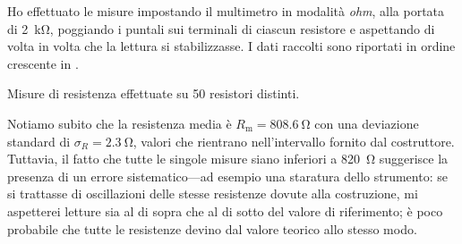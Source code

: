         Ho effettuato le misure impostando il multimetro in modalità \emph{ohm}, alla portata di \SI{2}{\kilo\ohm}, poggiando i puntali sui terminali di ciascun resistore e aspettando di volta in volta che la lettura si stabilizzasse. I dati raccolti sono riportati in ordine crescente in .
        \begin{table}
            \centering
            
            \caption{Misure di resistenza effettuate su \num{50} resistori distinti.}
            \label{tab:mul:resistori}
        \end{table}

        Notiamo subito che la resistenza media è $R_\text{m} = \SI{808.6}{\ohm}$ con una deviazione standard di $\sigma_R = \SI{2.3}{\ohm}$, valori che rientrano nell'intervallo fornito dal costruttore. Tuttavia, il fatto che tutte le singole misure siano inferiori a \SI{820}{\ohm} suggerisce la presenza di un errore sistematico---ad esempio una staratura dello strumento: se si trattasse di oscillazioni delle stesse resistenze dovute alla costruzione, mi aspetterei letture sia al di sopra che al di sotto del valore di riferimento; è poco probabile che tutte le resistenze devino dal valore teorico allo stesso modo.
        